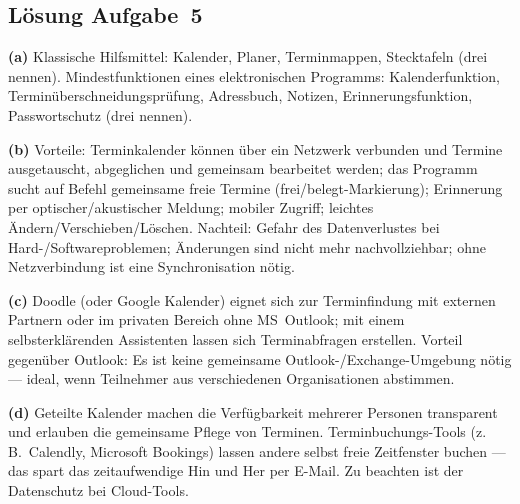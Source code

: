 \documentclass[11pt, a4paper]{article}
\begin{document}
\subsection*{Lösung Aufgabe~5}
\begin{loesung}
\textbf{(a)} Klassische Hilfsmittel: Kalender, Planer, Terminmappen, Stecktafeln (drei
nennen). Mindestfunktionen eines elektronischen Programms: Kalenderfunktion,
Terminüberschneidungsprüfung, Adressbuch, Notizen, Erinnerungsfunktion, Passwortschutz
(drei nennen).

\textbf{(b)} Vorteile: Terminkalender können über ein Netzwerk verbunden und Termine
ausgetauscht, abgeglichen und gemeinsam bearbeitet werden; das Programm sucht auf Befehl
gemeinsame freie Termine (frei/belegt-Markierung); Erinnerung per optischer/akustischer
Meldung; mobiler Zugriff; leichtes Ändern/Verschieben/Löschen. Nachteil: Gefahr des
Datenverlustes bei Hard-/Softwareproblemen; Änderungen sind nicht mehr nachvollziehbar;
ohne Netzverbindung ist eine Synchronisation nötig.

\textbf{(c)} Doodle (oder Google Kalender) eignet sich zur Terminfindung mit externen
Partnern oder im privaten Bereich ohne MS~Outlook; mit einem selbsterklärenden
Assistenten lassen sich Terminabfragen erstellen. Vorteil gegenüber Outlook: Es ist
keine gemeinsame Outlook-/Exchange-Umgebung nötig --- ideal, wenn Teilnehmer aus
verschiedenen Organisationen abstimmen.

\textbf{(d)} Geteilte Kalender machen die Verfügbarkeit mehrerer Personen transparent und
erlauben die gemeinsame Pflege von Terminen. Terminbuchungs-Tools (z.\,B.\ Calendly,
Microsoft Bookings) lassen andere selbst freie Zeitfenster buchen --- das spart das
zeitaufwendige Hin und Her per E-Mail. Zu beachten ist der Datenschutz bei Cloud-Tools.
\end{loesung}
\end{document}
